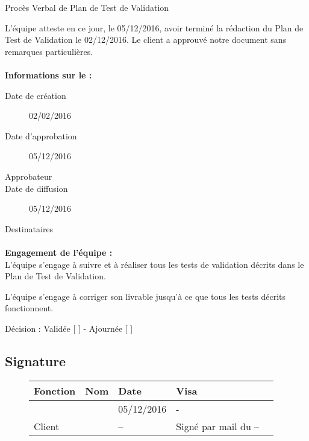\documentclass[asi, sansVersion]{picInsa}
\begin{document}
 
 \begin{center}
  \LARGE{}
    Procès Verbal de Plan de Test de Validation\\
 \end{center}
 
 \normalsize{}
 
L'équipe \nomEquipe{} atteste en ce jour, le 05/12/2016, avoir terminé la rédaction du Plan de Test de Validation le 02/12/2016.
Le client a approuvé notre document sans remarques particulières.


\paragraph{}
\textbf{Informations sur le \PTVCourt :}

\begin{description}
  \item[Date de création]02/02/2016
  \item[Date d'approbation]05/12/2016
  \item[Approbateur]\nomClient
  \item[Date de diffusion]05/12/2016
  \item[Destinataires]\nomEquipe
\end{description}

\paragraph{}
\textbf{Engagement de l'équipe :}\\


L'équipe \nomEquipe{} s'engage à suivre et à réaliser tous les tests de validation décrits dans le Plan de Test de Validation.


L'équipe \nomEquipe{} s'engage à corriger son livrable jusqu'à ce que tous les tests décrits fonctionnent.


\begin{center}
Décision : Validée [ \checkmark{} ] - Ajournée [ ]
\end{center}

\subsection*{Signature}
\begin{figure}[H]
		\centering
		\begin{tabularx}{17cm}{|p{4cm}|X|X|X|X|}
		\hline
		\rowcolor[gray]{0.85} Fonction & Nom & Date & Visa \\
		\hline
		\CP{} & \Pierre{} & 05/12/2016 & - \\
		\hline
		Client & \nomClient & -- & Signé par mail du --\\
		\hline
		\end{tabularx}
\end{figure}
\end{document}
